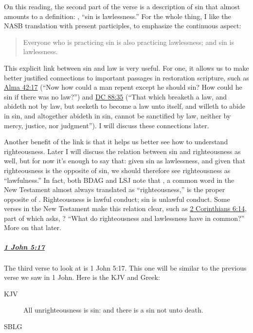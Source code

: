 				On this reading,
					the second part of the verse is a description of sin that almost amounts to a definition:
						,
							``sin is lawlessness.''
				For the whole thing,
					I like the NASB translation with present participles,
						to emphasize the continuous aspect:
				
					\begin{quote}
						Everyone who is practicing sin is also practicing lawlessness; and sin is lawlessness.
					\end{quote}
					
				This explicit link between sin and law is very useful.
				For one,
					it allows us to make better justified connections to important passages in restoration scripture,
						such as \hyperref[ALMA-42-17]{Alma 42:17} (``Now how could a man repent except he should sin? How could he sin if there was no law?'') and \hyperref[DC88-35]{DC 88:35} (``That which breaketh a law, and abideth not by law, but seeketh to become a law unto itself, and willeth to abide in sin, and altogether abideth in sin, cannot be sanctified by law, neither by mercy, justice, nor judgment'').
				I will discuss these connections later.
				
				Another benefit of the link is that it helps us better see how to understand righteousness.
				Later I will discuss the relation between sin and righteousness as well,
					but for now it's enough to say that:
						given sin as lawlessness,
							and given that righteousness is the opposite of sin,
								we should therefore see righteousness as ``lawfulness.''
				In fact,
					both BDAG and LSJ note that ,
						a common word in the New Testament almost always translated as ``righteousness,''
							is the proper opposite of .
				Righteousness is lawful conduct;
					sin is unlawful conduct.
				Some verses in the New Testament make this relation clear,
					such as \hyperref[2CORINTHIANS-6-14]{2 Corinthians 6:14},
						part of which asks,
							?
				``What do righteousness and lawlessness have in common?''
				More on that later.
				
			\subparagraph{\hyperref[1JOHN-5-17]{1 John 5:17}}
				\label{SIN-1john-5-17}
				
				The third verse to look at is 1 John 5:17.
				This one will be similar to the previous verse we saw in 1 John.
				Here is the KJV and Greek:
				
					\begin{description}
						\item[KJV] All unrighteousness is sin: and there is a sin not unto death.
						\item[SBLG] 
					\end{description}
					
